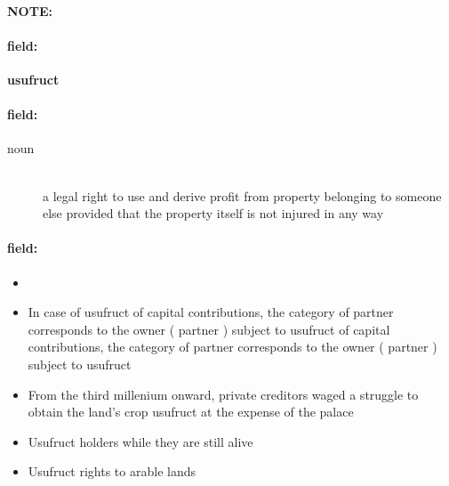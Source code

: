 \documentclass[12pt]{article}
\newenvironment{note}{\paragraph{NOTE:}}{}
\newenvironment{field}{\paragraph{field:}}{}
\begin{document}
\begin{note}
\begin{field}
\textbf{\large usufruct}
\end{field}


\begin{field}
\begin{description}
\item[noun] \hfill \\ 
a legal right to use and derive profit from property belonging to someone else provided that the property itself is not injured in any way

\end{description}
\end{field}

\begin{field}
\begin{itemize}
\item 
\item In case of usufruct of capital contributions, the category of partner corresponds to the owner ( partner ) subject to usufruct of capital contributions, the category of partner corresponds to the owner ( partner ) subject to usufruct
\item From the third millenium onward, private creditors waged a struggle to obtain the land's crop usufruct at the expense of the palace
\item Usufruct holders while they are still alive
\item Usufruct rights to arable lands
\end{itemize}
\end{field}
\end{note}
\end{document}

